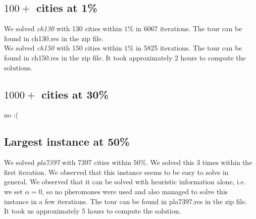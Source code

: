 \documentclass{article}
\begin{document}
\subsection{$100+$ cities at 1\%}
We solved \textit{ch130} with 130 cities within $1\%$ in 6067 iterations. The tour can be found in ch130.res in the zip file.\\
We solved \textit{ch150} with 150 cities within $1\%$ in 5825 iterations. The tour can be found in ch150.res in the zip file.
It took approximately 2 hours to compute the solutions.

\subsection{$1000+$ cities at 30\%}
no :(


\subsection{Largest instance at 50\%}
We solved \textit{pla7397} with 7397 cities within $50\%$. We solved this 3 times within the first iteration. We observed that this instance seems to be easy to solve in general. We observed that it can be solved with heuristic information alone, i.e. we set $\alpha = 0$, so no pheromones were used and also managed to solve this instance in a few iterations. The tour can be found in pla7397.res in the zip file.
It took us approximately 5 hours to compute the solution.
\end{document}
